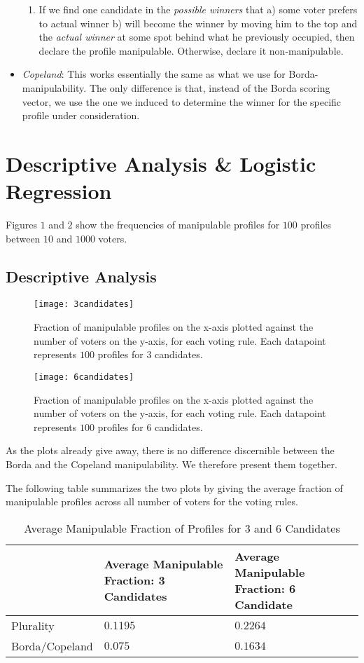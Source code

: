 \documentclass[10pt,a4paper]{article}
\begin{document}
\begin{itemize}
\begin{enumerate}
\item If we find one candidate in the \textit{possible winners} that a) some voter prefers to actual winner b) will become the winner by moving him to the top and the \textit{actual winner} at some spot behind what he previously occupied, then declare the profile manipulable. Otherwise, declare it non-manipulable.
\end{enumerate}
\item \textit{Copeland}: This works essentially the same as what we use for Borda-manipulability. The only difference is that, instead of the Borda scoring vector, we use the one we induced to determine the winner for the specific profile under consideration.
\end{itemize}
\section{Descriptive Analysis \& Logistic Regression}
Figures $1$ and $2$ show the frequencies of manipulable profiles for $100$ profiles between $10$ and $1000$ voters.
\subsection{Descriptive Analysis}
\begin{SCfigure}[0.5][h]
\caption{Fraction of manipulable profiles on the x-axis plotted against the number of voters on the y-axis, for each voting rule. Each datapoint represents $100$ profiles for $3$ candidates.}
\texttt{[image: 3candidates]}
\end{SCfigure}

\begin{SCfigure}[0.5][h]
\caption{Fraction of manipulable profiles on the x-axis plotted against the number of voters on the y-axis, for each voting rule. Each datapoint represents $100$ profiles for $6$ candidates.}
\texttt{[image: 6candidates]}
\end{SCfigure}

As the plots already give away, there is no difference discernible between the Borda and the Copeland manipulability. We therefore present them together. 

The following table summarizes the two plots by giving the average fraction of manipulable profiles across all number of voters for the voting rules.

\begin{table}[h]
\centering
\caption{Average Manipulable Fraction of Profiles for $3$ and $6$ Candidates}
\label{my-label}
\begin{tabular}{|l|l|l|}
\hline
               & Average Manipulable Fraction: 3 Candidates & Average Manipulable Fraction: 6 Candidate \\ \hline
Plurality      & $0.1195$                                   & $0.2264$                                  \\ \hline
Borda/Copeland & $0.075$                                     & $0.1634$                                  \\ \hline
\end{tabular}
\end{table}
\end{document}
